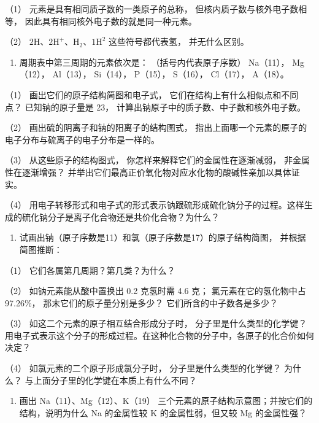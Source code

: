 （1） 元素是具有相同质子数的一类原子的总称，
但核内质子数与核外电子数相等， 因此具有相同核外电子数的就是同一种元素。

（2）
\(2 \mathrm{H}\text{、} 2 \mathrm{H}^{+}\text{、} \mathrm{H}_{2}\text{、} 1 \mathrm{H}^{2}\)
这些符号都代表氢， 并无什么区别。

\begin{enumerate}[start=4]
\item
  周期表中第三周期的元素依次是： （括号内代表原子序数） Na（11），
  Mg（12）， Al（13）， Si（14）， P（15）， S（16）， Cl（17），
  A（18）。
\end{enumerate}

（1） 画出它们的原子结构简图和电子式，
它们在结构上有什么相似点和不同点？ 已知钠的原子量是 23，
计算出钠原子中的质子数、中子数和核外电子数。

（2） 画出硫的阴离子和钠的阳离子的结构图式，
指出上面哪一个元素的原子的电子分布与硫离子的电子分布是一样的。

（3） 从这些原子的结构图式， 你怎样来解释它们的金属性在逐渐减弱，
非金属性在逐渐增强？
并举出它们最高正价氧化物对应水化物的酸碱性亲加以具体证实。

（4）
用电子转移形式和电子式的形式表示钠跟硫形成硫化钠分子的过程。这样生成的硫化钠分子是离子化合物还是共价化合物？为什么？

\begin{enumerate}[start=5]
\item
  试画出钠（原子序数是11）和氯（原子序数是17）的原子结构简图，
  并根据简图推断：
\end{enumerate}

（1） 它们各属第几周期？第几类？为什么？

（2） 如钠元素能从酸中置换出 0.2 克氢时需 4.6 克；
氯元素在它的氢化物中占 97.26\%， 那末它们的原子量分别是多少？
它们所含的中子数各是多少？

（3） 如这二个元素的原子相互结合形成分子时，
分子里是什么类型的化学键？用电子式表示这个分子的形成过程。在这种化合物的分子中，各原子的化合价如何决定？

（4） 如氯元素的二个原子形成氯分子时， 分子里是什么类型的化学键？
为什么？ 与上面分子里的化学键在本质上有什么不同？

\begin{enumerate}[start=6]
\item
  画出 Na（11）、Mg（12）、K（19）
  三个元素的原子结构示意图；并按它们的结构，说明为什么 Na 的金属性较 K
  的金属性弱，但又较 Mg 的金属性强？
\end{enumerate}

